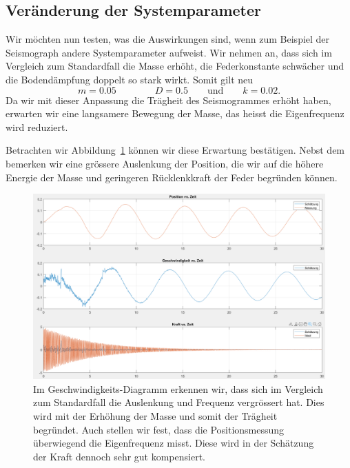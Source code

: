 \subsection{Veränderung der Systemparameter}
Wir möchten nun testen, was die Auswirkungen sind, wenn zum Beispiel der Seismograph andere Systemparameter aufweist.
Wir nehmen an, dass sich im Vergleich zum Standardfall die Masse erhöht, die Federkonstante schwächer und die Bodendämpfung doppelt so stark wirkt.
Somit gilt neu
\[
m = 0.05
\qquad \qquad
D = 0.5
\qquad \text{und} \qquad
k = 0.02.
\]
Da wir mit dieser Anpassung die Trägheit des Seismogrammes erhöht haben,
erwarten wir eine langsamere Bewegung der Masse, das heisst die Eigenfrequenz wird reduziert.

Betrachten wir Abbildung~\ref{erdbeben:fig:systemparameter-geaendert} können wir diese Erwartung bestätigen.
Nebst dem bemerken wir eine grössere Auslenkung der Position, die wir auf die höhere Energie der Masse und geringeren Rücklenkkraft der Feder begründen können.

\begin{figure}
  \begin{center}
    \includegraphics[width=\linewidth,keepaspectratio]{papers/erdbeben/Systemparameter_geaendert.PNG}
      \caption{
        Im Geschwindigkeits-Diagramm erkennen wir,
        dass sich im Vergleich zum Standardfall die Auslenkung und Frequenz vergrössert hat.
        Dies wird mit der Erhöhung der Masse und somit der Trägheit begründet.
        Auch stellen wir fest, dass die Positionsmessung überwiegend die Eigenfrequenz misst.
        Diese wird in der Schätzung der Kraft dennoch sehr gut kompensiert.
      }
    \label{erdbeben:fig:systemparameter-geaendert}
  \end{center}
\end{figure}

